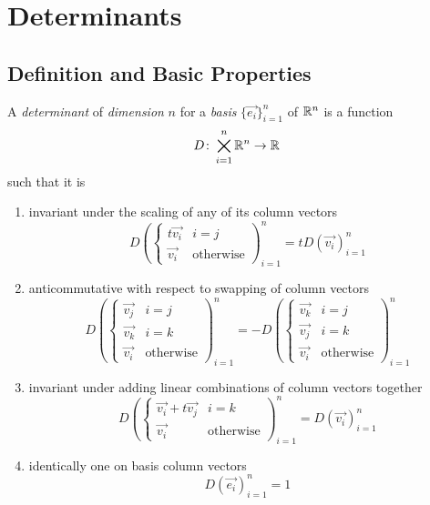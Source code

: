 \documentclass[notes.tex]{subfiles}
\begin{document}
\setcounter{section}{4}
\section{Determinants}
\subsection{Definition and Basic Properties}
\begin{definition}[Determinant]
    A \textit{determinant} of \textit{dimension} $n$ for a \textit{basis} $\{ \vec{e_i} \}_{i = 1}^n$ of $\mathbb{R}^n$ is a function
    \[
        D\colon \bigtimes_{i = 1}^n \mathbb{R}^n \to \mathbb{R}
    \]
    such that it is
    \begin{enumerate}[label = (\arabic*)]
        \item invariant under the scaling of any of its column vectors
        \[
            D\left(\begin{cases} 
                t\vec{v_i} & i = j \\
                \vec{v_i} & \text{otherwise}
            \end{cases}
            \right)_{i = 1}^n = tD(\vec{v_i})_{i = 1}^n
        \]
        \item anticommutative with respect to swapping of column vectors
        \[
            D\left(\begin{cases}
                \vec{v_j} & i = j \\
                \vec{v_k} & i = k \\
                \vec{v_i} & \text{otherwise}
            \end{cases}\right)_{i = 1}^n
            =
            -D\left(\begin{cases}
                \vec{v_k} & i = j \\
                \vec{v_j} & i = k \\
                \vec{v_i} & \text{otherwise}
            \end{cases}\right)_{i = 1}^n
        \]
        \item invariant under adding linear combinations of column vectors together
        \[
            D\left(\begin{cases}
                \vec{v_i} + t\vec{v_j} & i = k \\
                \vec{v_i} & \text{otherwise}
            \end{cases}\right)_{i = 1}^n = D(\vec{v_i})_{i = 1}^n
        \]
        \item identically one on basis column vectors
        \[
            D(\vec{e_i})_{i = 1}^n = 1
        \]
    \end{enumerate}
\end{definition}
\end{document}
